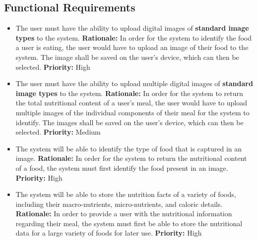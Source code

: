 \documentclass[12pt]{article}
\newcounter{FRCounter}
\newcommand{\FillFRNumber}{\textbf{FR\arabic{FRCounter}.} \stepcounter{FRCounter}}
\begin{document}
\subsection{Functional Requirements}


\begin{itemize}
    \item [\FillFRNumber] The user must have the ability to upload digital images of \textbf{standard image types} to the system.\newline 
    \textbf{Rationale:} In order for the system to identify the food a user is eating, the user would have to upload an image of their food to the system. The image shall be saved on the user’s device, which can then be selected.\newline
    \textbf{Priority:} High
\end{itemize}

\begin{itemize}
    \item [\FillFRNumber] The user must have the ability to upload multiple digital images of \textbf{standard image types} to the system.\newline
    \textbf{Rationale:} In order for the system to return the total nutritional content of a user's meal, the user would have to upload multiple images of the individual components of their meal for the system to identify. The images shall be saved on the user’s device, which can then be selected.\newline
    \textbf{Priority:} Medium
\end{itemize}

\begin{itemize}
    \item [\FillFRNumber] The system will be able to identify the type of food that is captured in an image. \newline
    \textbf{Rationale:} In order for the system to return the nutritional content of a food, the system must first identify the food present in an image.\newline
    \textbf{Priority:} High
\end{itemize}

\begin{itemize}
    \item [\FillFRNumber] The system will be able to store the nutrition facts of a variety of foods, including their macro-nutrients, micro-nutrients, and caloric details. \newline
    \textbf{Rationale:} In order to provide a user with the nutritional information regarding their meal, the system must first be able to store the nutritional data for a large variety of foods for later use.\newline
    \textbf{Priority:} High
\end{itemize}
\end{document}
